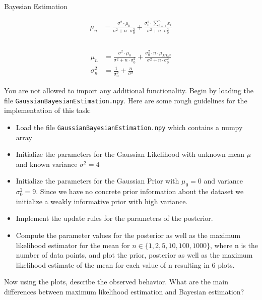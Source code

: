 \documentclass[
	english,
        solution=true
	]{tudaexercise}
\begin{document}
\begin{task}[points=16]{Bayesian Estimation}
\begin{subtask}[points=12]
    \begin{align}
        \mu_{n} &= \frac{\sigma^{2} \cdot \mu_{0}}{\sigma^{2}+n\cdot\sigma_{0}^{2}} + \frac{\sigma_{0}^{2}\cdot \sum_{i=1}^{n} x_i}{\sigma^{2}+n\cdot\sigma_{0}^{2}}\\
    \end{align}
        \\
    \begin{align}
        \mu_{n} &= \frac{\sigma^{2} \cdot \mu_{0}}{\sigma^{2}+n\cdot\sigma_{0}^{2}} + \frac{\sigma_{0}^{2}\cdot n \cdot \mu_{MLE}}{\sigma^{2}+n\cdot\sigma_{0}^{2}}\\
        \sigma_{n}^{2} &= \frac{1}{\sigma_{0}^{2}} + \frac{n}{\sigma^{2}} 
    \end{align}

    You are not allowed to import any additional functionality. Begin by loading the file \texttt{GaussianBayesianEstimation.npy}. Here are some rough guidelines for the implementation of this task:
    \begin{itemize}
        \item Load the file \texttt{GaussianBayesianEstimation.npy} which contains a numpy array 
        \item Initialize the parameters for the Gaussian Likelihood with unknown mean $\mu$ and known variance $\sigma^{2}=4$  
        \item Initialize the parameters for the Gaussian Prior with $\mu_{0}=0$ and variance $\sigma_{0}^2=9$. Since we have no concrete prior information about the dataset we initialize a weakly informative prior with high variance.
        \item Implement the update rules for the parameters of the posterior.
        \item Compute the parameter values for the posterior as well as the maximum likelihood estimator for the mean for $n \in \{1, 2, 5, 10, 100, 1000\}$, where n is the number of data points, and plot the prior, posterior as well as the maximum likelihood estimate of the mean for each value of n resulting in 6 plots.
    \end{itemize}
    Now using the plots, describe the observed behavior. What are the main differences between maximum likelihood estimation and Bayesian estimation?
\end{subtask}

\begin{solution}


\end{solution}
\end{task}
\end{document}
